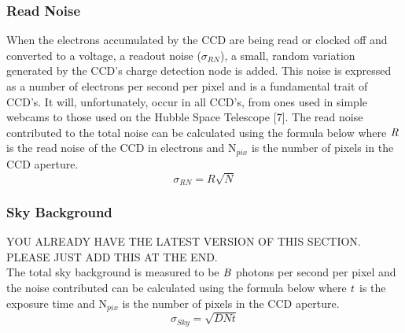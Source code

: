 \documentclass[pdf,color]{UoBnote}
\begin{document}
\subsubsection{Read Noise}
When the electrons accumulated by the CCD are being read or clocked off and converted to a voltage, a readout noise ($\sigma$$_{RN}$), a small, random variation generated by the CCD’s charge detection node is added. This noise is expressed as a number of electrons per second per pixel and is a fundamental trait of CCD’s. It will, unfortunately, occur in all CCD’s, from ones used in simple webcams to those used on the Hubble Space Telescope [7]. The read noise contributed to the total noise can be calculated using the formula below where $\it{R}$ is the read noise of the CCD in electrons and N$_{pix}$ is the number of pixels in the CCD aperture.\\
\begin{equation}
\sigma_{RN} = R\sqrt{N}
\end{equation}

\subsubsection{Sky Background}
YOU ALREADY HAVE THE LATEST VERSION OF THIS SECTION. PLEASE JUST ADD THIS AT THE END.\\
The total sky background is measured to be $\it{B}$ photons per second per pixel and the noise contributed can be calculated using the formula below where $\it{t}$ is the exposure time and N$_{pix}$ is the number of pixels in the CCD aperture.\\
\begin{equation}
\sigma_{Sky} = \sqrt{DNt}
\end{equation}
\end{document}
